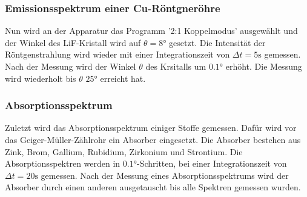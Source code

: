\subsubsection{Emissionsspektrum einer Cu-Röntgneröhre}
\label{sec:emission}
Nun wird an der Apparatur das Programm '2:1 Koppelmodus' ausgewählt und der Winkel des LiF-Kristall wird auf $\theta = 8 \si{\degree}$ gesetzt.
Die Intensität der Röntgenstrahlung wird wieder mit einer Integrationszeit von $\Delta t = 5 \si{\second}$ gemessen.
Nach der Messung wird der Winkel $\theta$ des Krsitalls um $0.1 \si{\degree}$ erhöht.
Die Messung wird wiederholt bis $\theta$ $25\si{\degree}$ erreicht hat.

\subsubsection{Absorptionsspektrum}
\label{sec:abso}
Zuletzt wird das Absorptionsspektrum einiger Stoffe gemessen.
Dafür wird vor das Geiger-Müller-Zählrohr ein Absorber eingesetzt.
Die Absorber bestehen aus Zink, Brom, Gallium, Rubidium, Zirkonium und Strontium.
Die Absorptionsspektren werden in $0.1\si{\degree}$-Schritten, bei einer Integrationszeit von $\Delta t = 20 \si{\second}$ gemessen.
Nach der Messung eines Absorptionsspektrums wird der Absorber durch einen anderen ausgetauscht bis alle Spektren gemessen wurden.
